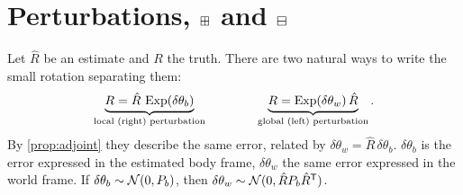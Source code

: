 \section{Perturbations, \texorpdfstring{$\boxplus$}{boxplus} and \texorpdfstring{$\boxminus$}{boxminus}}
\label{sec:perturbations}
\label{sec:boxplus}

Let $\hat R$ be an estimate and $R$ the truth. There are two natural ways to write the small rotation
separating them:
\begin{equation}
  \underbrace{R = \hat R\,\operatorname{Exp}(\delta\theta_b)}_{\text{local (right) perturbation}}
  \qquad\qquad
  \underbrace{R = \operatorname{Exp}(\delta\theta_w)\,\hat R}_{\text{global (left) perturbation}} .
\end{equation}
By \cref{prop:adjoint} they describe the same error, related by $\delta\theta_w = \hat R\,\delta\theta_b$.
$\delta\theta_b$ is the error expressed in the estimated body frame, $\delta\theta_w$ the same error expressed in
the world frame. If $\delta\theta_b \sim \mathcal{N}(0, P_b)$, then $\delta\theta_w \sim \mathcal{N}(0, \hat R P_b \hat R^{\mathsf{T}})$.

